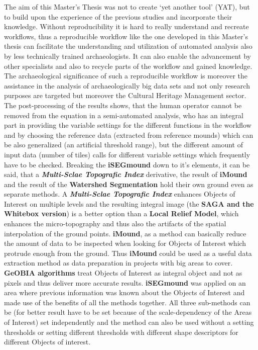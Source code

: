 \documentclass[
  12pt,
]{article}
\begin{document}
The aim of this Master's Thesis was not to create `yet another tool' (YAT), but to build upon the experience of the previous studies and incorporate their knowledge. Without reproducibility it is hard to really understand and recreate workflows, thus a reproducible workflow like the one developed in this Master's thesis can facilitate the understanding and utilization of automated analysis also by less technically trained archaeologists. It can also enable the advancement by other specialists and also to recycle parts of the workflow and gained knowledge.
The archaeological significance of such a reproducible workflow is moreover the assistance in the analysis of archaeologically big data sets and not only research purposes are targeted but moreover the Cultural Heritage Management sector. The post-processing of the results shows, that the human operator cannot be removed from the equation in a semi-automated analysis, who has an integral part in providing the variable settings for the different functions in the workflow and by choosing the reference data (extracted from reference mounds) which can be also generalized (an artificial threshold range), but the different amount of input data (number of tiles) calls for different variable settings which frequently have to be checked.
Breaking the \textbf{iSEGmound} down to it's elements, it can be said, that a \textbf{\emph{Multi-Sclae Topografic Index}} derivative, the result of \textbf{iMound} and the result of the \textbf{Watershed Segmentation} hold their own ground even as separate methods.
A \textbf{\emph{Multi-Sclae Topografic Index}} enhances Objects of Interest on multiple levels and the resulting integral image (the \textbf{SAGA and the Whitebox version}) is a better option than a \textbf{Local Relief Model}, which enhances the micro-topography and thus also the artifacts of the spatial interpolation of the ground points.
\newline
\textbf{iMound}, as a method can basically reduce the amount of data to be inspected when looking for Objects of Interest which protrude enough from the ground. Thus \textbf{iMound} could be used as a useful data extraction method as data preparation in projects with big areas to cover.
\newline
\textbf{GeOBIA algorithms} treat Objects of Interest as integral object and not as pixels and thus deliver more accurate results.
\newline
\textbf{iSEGmound} was applied on an area where previous information was known about the Objects of Interest and made use of the benefits of all the methods together. All three sub-methods can be (for better result have to be set because of the scale-dependency of the Areas of Interest) set independently and the method can also be used without a setting thresholds or setting different thresholds with different shape descriptors for different Objects of interest.
\end{document}
